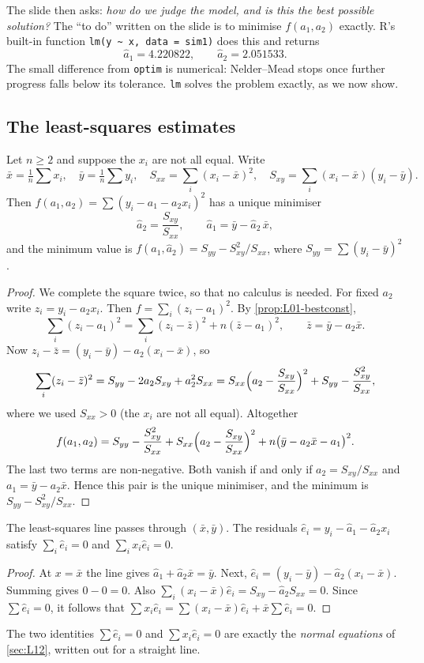 The slide then asks: \emph{how do we judge the model, and is this the best possible solution?}
The ``to do'' written on the slide is to minimise $f(a_1,a_2)$ exactly. R's built-in function
\texttt{lm(y \textasciitilde\ x, data = sim1)} does this and returns
\[
\hat a_1 = 4.220822,\qquad \hat a_2=2.051533 .
\]
The small difference from \texttt{optim} is numerical: Nelder--Mead stops once further progress
falls below its tolerance. \texttt{lm} solves the problem exactly, as we now show.

\subsection{The least-squares estimates}
\begin{theorem}\label{thm:L05-slr}
Let $n\ge 2$ and suppose the $x_i$ are not all equal. Write
\[
\bar x=\tfrac1n\sum x_i,\quad \bar y=\tfrac1n\sum y_i,\quad
S_{xx}=\sum_{i}(x_i-\bar x)^2,\quad S_{xy}=\sum_i (x_i-\bar x)(y_i-\bar y).
\]
Then $f(a_1,a_2)=\sum(y_i-a_1-a_2x_i)^2$ has a unique minimiser
\[
\hat a_2=\frac{S_{xy}}{S_{xx}},\qquad \hat a_1=\bar y-\hat a_2\,\bar x ,
\]
and the minimum value is $f(\hat a_1,\hat a_2)=S_{yy}-S_{xy}^2/S_{xx}$, where $S_{yy}=\sum(y_i-\bar y)^2$.
\end{theorem}
\begin{proof}
We complete the square twice, so that no calculus is needed. For fixed $a_2$ write
$z_i=y_i-a_2x_i$. Then $f=\sum_i(z_i-a_1)^2$. By \cref{prop:L01-bestconst},
\[
\sum_i (z_i-a_1)^2=\sum_i (z_i-\bar z)^2+n(\bar z-a_1)^2,\qquad \bar z=\bar y-a_2\bar x .
\]
Now $z_i-\bar z=(y_i-\bar y)-a_2(x_i-\bar x)$, so
\[
\sum_i (z_i-\bar z)^2=S_{yy}-2a_2S_{xy}+a_2^2S_{xx}
= S_{xx}\Bigl(a_2-\frac{S_{xy}}{S_{xx}}\Bigr)^2 + S_{yy}-\frac{S_{xy}^2}{S_{xx}} ,
\]
where we used $S_{xx}>0$ (the $x_i$ are not all equal). Altogether
\[
f(a_1,a_2)= S_{yy}-\frac{S_{xy}^2}{S_{xx}} + S_{xx}\Bigl(a_2-\frac{S_{xy}}{S_{xx}}\Bigr)^2 + n\bigl(\bar y-a_2\bar x-a_1\bigr)^2 .
\]
The last two terms are non-negative. Both vanish if and only if $a_2=S_{xy}/S_{xx}$ and
$a_1=\bar y-a_2\bar x$. Hence this pair is the unique minimiser, and the minimum is
$S_{yy}-S_{xy}^2/S_{xx}$.
\end{proof}

\begin{corollary}\label{cor:L05-props}
The least-squares line passes through $(\bar x,\bar y)$. The residuals
$\hat e_i=y_i-\hat a_1-\hat a_2x_i$ satisfy $\sum_i\hat e_i=0$ and $\sum_i x_i\hat e_i=0$.
\end{corollary}
\begin{proof}
At $x=\bar x$ the line gives $\hat a_1+\hat a_2\bar x=\bar y$. Next,
$\hat e_i=(y_i-\bar y)-\hat a_2(x_i-\bar x)$. Summing gives $0-0=0$. Also
$\sum_i (x_i-\bar x)\hat e_i=S_{xy}-\hat a_2S_{xx}=0$. Since $\sum\hat e_i=0$, it follows that
$\sum x_i\hat e_i=\sum(x_i-\bar x)\hat e_i+\bar x\sum\hat e_i=0$.
\end{proof}
The two identities $\sum\hat e_i=0$ and $\sum x_i\hat e_i=0$ are exactly the \emph{normal
equations} of \cref{sec:L12}, written out for a straight line.

